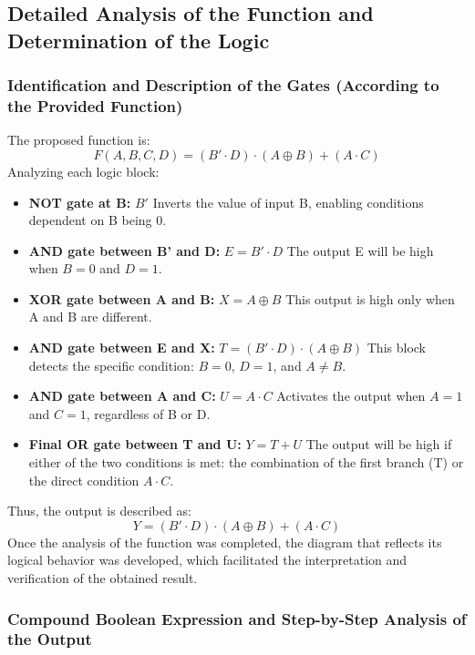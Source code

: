 \documentclass[12pt]{article}  %
\begin{document}
\subsection{Detailed Analysis of the Function and Determination of the Logic}

\subsubsection{Identification and Description of the Gates (According to the Provided Function)}
The proposed function is:
$$F(A,B,C,D) = (B' \cdot D) \cdot (A \oplus B) + (A \cdot C)$$
Analyzing each logic block:
\begin{itemize}
    \item \textbf{NOT gate at B:} $B'$
    Inverts the value of input B, enabling conditions dependent on B being 0.
    \item \textbf{AND gate between B' and D:} $E = B' \cdot D$
    The output E will be high when $B=0$ and $D=1$.
    \item \textbf{XOR gate between A and B:} $X = A \oplus B$
    This output is high only when A and B are different.
    \item \textbf{AND gate between E and X:} $T = (B' \cdot D) \cdot (A \oplus B)$
    This block detects the specific condition: $B=0$, $D=1$, and $A \neq B$.
    \item \textbf{AND gate between A and C:} $U = A \cdot C$
    Activates the output when $A=1$ and $C=1$, regardless of B or D.
    \item \textbf{Final OR gate between T and U:} $Y = T + U$
    The output will be high if either of the two conditions is met: the combination of the first branch (T) or the direct condition $A \cdot C$.
\end{itemize}
Thus, the output is described as:
$$Y = (B' \cdot D) \cdot (A \oplus B) + (A \cdot C)$$
Once the analysis of the function was completed, the diagram that reflects its logical behavior was developed, which facilitated the interpretation and verification of the obtained result.

\subsubsection{Compound Boolean Expression and Step-by-Step Analysis of the Output}
\end{document}
